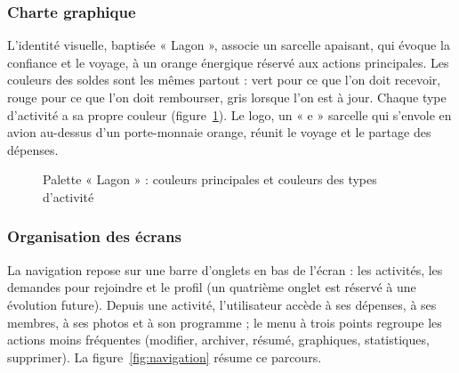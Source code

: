 \subsubsection{Charte graphique}

L'identité visuelle, baptisée « Lagon », associe un sarcelle apaisant, qui évoque la
confiance et le voyage, à un orange énergique réservé aux actions principales. Les couleurs
des soldes sont les mêmes partout : vert pour ce que l'on doit recevoir, rouge pour ce que
l'on doit rembourser, gris lorsque l'on est à jour. Chaque type d'activité a sa propre
couleur (figure~\ref{fig:charte}). Le logo, un « e » sarcelle qui s'envole en avion au-dessus
d'un porte-monnaie orange, réunit le voyage et le partage des dépenses.

\begin{figure}[H]
\centering
{}
\caption{Palette « Lagon » : couleurs principales et couleurs des types d'activité}
\label{fig:charte}
\end{figure}

\subsubsection{Organisation des écrans}

La navigation repose sur une barre d'onglets en bas de l'écran : les activités, les demandes
pour rejoindre et le profil (un quatrième onglet est réservé à une évolution future). Depuis une activité, l'utilisateur accède à ses dépenses, à ses
membres, à ses photos et à son programme ; le menu à trois points regroupe les actions moins
fréquentes (modifier, archiver, résumé, graphiques, statistiques, supprimer). La
figure~\ref{fig:navigation} résume ce parcours.

